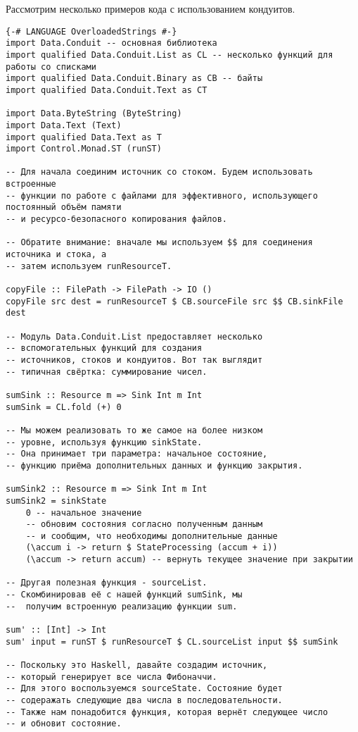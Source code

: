 Рассмотрим несколько примеров кода с использованием кондуитов.
\begin{lstlisting}
{-# LANGUAGE OverloadedStrings #-}
import Data.Conduit -- основная библиотека
import qualified Data.Conduit.List as CL -- несколько функций для работы со списками
import qualified Data.Conduit.Binary as CB -- байты
import qualified Data.Conduit.Text as CT

import Data.ByteString (ByteString)
import Data.Text (Text)
import qualified Data.Text as T
import Control.Monad.ST (runST)

-- Для начала соединим источник со стоком. Будем использовать встроенные
-- функции по работе с файлами для эффективного, использующего постоянный объём памяти
-- и ресурсо-безопасного копирования файлов.

-- Обратите внимание: вначале мы используем $$ для соединения источника и стока, а
-- затем используем runResourceT.

copyFile :: FilePath -> FilePath -> IO ()
copyFile src dest = runResourceT $ CB.sourceFile src $$ CB.sinkFile dest

-- Модуль Data.Conduit.List предоставляет несколько
-- вспомогательных функций для создания
-- источников, стоков и кондуитов. Вот так выглядит
-- типичная свёртка: суммирование чисел.

sumSink :: Resource m => Sink Int m Int
sumSink = CL.fold (+) 0

-- Мы можем реализовать то же самое на более низком
-- уровне, используя функцию sinkState.
-- Она принимает три параметра: начальное состояние,
-- функцию приёма дополнительных данных и функцию закрытия.

sumSink2 :: Resource m => Sink Int m Int
sumSink2 = sinkState
    0 -- начальное значение
    -- обновим состояния согласно полученным данным
    -- и сообщим, что необходимы дополнительные данные
    (\accum i -> return $ StateProcessing (accum + i))
    (\accum -> return accum) -- вернуть текущее значение при закрытии

-- Другая полезная функция - sourceList.
-- Скомбинировав её с нашей функций sumSink, мы
--  получим встроенную реализацию функции sum.

sum' :: [Int] -> Int
sum' input = runST $ runResourceT $ CL.sourceList input $$ sumSink

-- Поскольку это Haskell, давайте создадим источник,
-- который генерирует все числа Фибоначчи.
-- Для этого воспользуемся sourceState. Состояние будет
-- содеражать следующие два числа в последовательности.
-- Также нам понадобится функция, которая вернёт следующее число
-- и обновит состояние.


\end{lstlisting}
